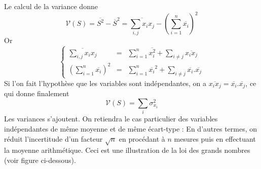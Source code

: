 Le calcul de la variance donne 
	\[\mathcal{V}(S)=\overline{S^{2}}-\overline{S}^{2}=
	\overline{\sum_{i,j}x_{i}x_{j}}-\left(\sum_{i=1}^{n}\overline{x_{i}}\right)^{2}\]
Or
	\[\left\{\begin{array}{ccc}
	\displaystyle{\overline{\sum_{i,j}x_{i}x_{j}}}
	&=
	&\displaystyle{\sum_{i=1}^{n}\overline{x_{i}^{2}}+\sum_{i\neq j}\overline{x_{i}x_{j}}}\\[3mm]
	
	\displaystyle{\left(\sum_{i=1}^{n}\overline{x_{i}}\right)^{2}}
	&=
	&\displaystyle{\sum_{i=1}^{n}\overline{x_{i}}^{2}+\sum_{i\neq j} \overline{x_{i}}.\overline{x_{j}}}
	\end{array}\right.\]
Si l'on fait l'hypothèse que les variables sont indépendantes, on a $\overline{x_{i}x_{j}}=\overline{x_{i}}.\overline{x_{j}}$, ce qui donne finalement 
	\[\mathcal{V}(S)=\sum_{i}\sigma_{x_{i}}^{2}\]
Les variances s'ajoutent. On retiendra le cas particulier des variables indépendantes de même moyenne et de même écart-type :
En d'autres termes, on réduit l'incertitude d'un facteur $\sqrt{n}$ en procédant à $n$ mesures puis en effectuant la moyenne arithmétique. Ceci est une illustration de la loi des grands nombres (voir figure ci-dessous).

